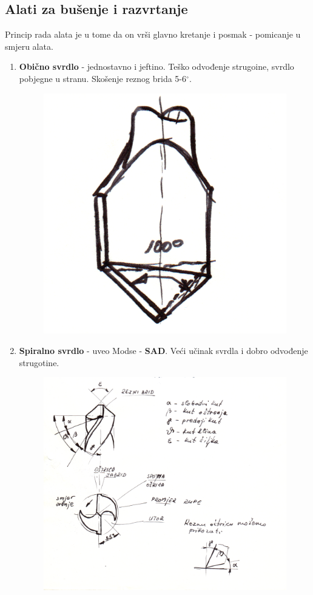 \documentclass[a4paper,12pt]{article}
\numberwithin{figure}{section}
\begin{document}
\subsection{Alati za bušenje i razvrtanje}
Princip rada alata je u tome da on vrši glavno kretanje i posmak - pomicanje u smjeru alata.
\begin{enumerate}
\item \textbf{Obično svrdlo} - jednostavno i jeftino. Teško odvođenje strugoine, svrdlo pobjegne u stranu. Skošenje reznog brida 5-6$^{\circ}$.
\begin{figure}[!h]
\centering
\includegraphics[scale=0.12]{image_22-1.png}
\end{figure}
\FloatBarrier
\item \textbf{Spiralno svrdlo} - uveo Modse - \textbf{SAD}. Veći učinak svrdla i dobro odvođenje strugotine.
\begin{figure}[!h]
\centering
\includegraphics[scale=0.13]{image_22-2.png}
\end{figure}
\FloatBarrier
\end{enumerate}
\end{document}
